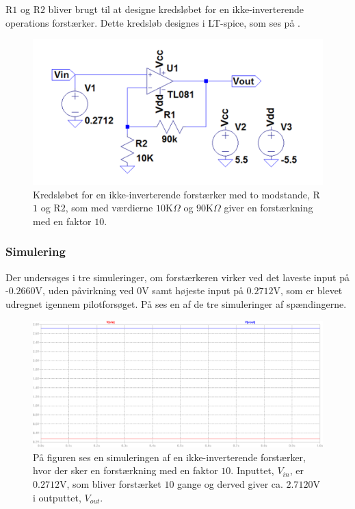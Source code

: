 \noindent R$1$ og R$2$ bliver brugt til at designe kredsløbet for en ikke-inverterende operations forstærker. Dette kredsløb designes i LT-spice, som ses på . 
\begin{figure}[H]
\centering
\includegraphics[scale=0.5]{figures/cProblemloesning/Forstaerker_faktor18.PNG}
\caption{Kredsløbet for en ikke-inverterende forstærker med to modstande, R$1$ og R$2$, som med værdierne $10$K$\Omega$ og $90$K$\Omega$ giver en forstærkning med en faktor $10$.}
\label{fig:Forstaerker_faktor18}
\end{figure} 

\subsubsection{Simulering}\label{Subsec:Forstaerker_simu}
Der undersøges i tre simuleringer, om forstærkeren virker ved det laveste input på -$0.2660$V, uden påvirkning ved $0$V samt højeste input på $0.2712$V, som er blevet udregnet igennem pilotforsøget. På  ses en af de tre simuleringer af spændingerne.

\begin{figure}[H]
\centering
\includegraphics[scale=0.4]{figures/cProblemloesning/Forstaerker_faktor18_simulering.PNG}
\caption{På figuren ses en simuleringen af en ikke-inverterende forstærker, hvor der sker en forstærkning med en faktor $10$. Inputtet, $V_{in}$, er $0.2712$V, som bliver forstærket $10$ gange og derved giver ca. $2.7120$V i outputtet, $V_{out}$.}
\label{fig:Forstaerker_faktor18_simulering}
\end{figure}

